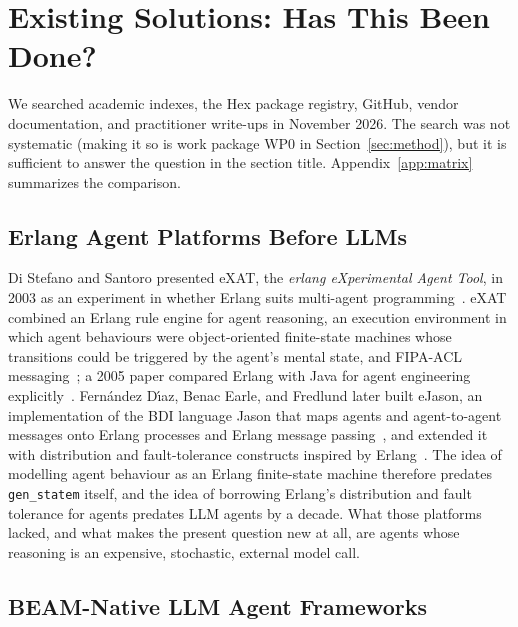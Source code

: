 \documentclass[conference,letterpaper]{IEEEtran}
\newcommand{\code}[1]{\texttt{#1}}
\newcommand{\gsm}{\code{gen\_statem}}
\begin{document}
\section{Existing Solutions: Has This Been Done?}\label{sec:survey}

We searched academic indexes, the Hex package registry, GitHub, vendor
documentation, and practitioner write-ups in November 2026. The search was
not systematic (making it so is work package WP0 in
Section~\ref{sec:method}), but it is sufficient to answer the question in
the section title. Appendix~\ref{app:matrix} summarizes the comparison.

\subsection{Erlang Agent Platforms Before LLMs}

Di Stefano and Santoro presented eXAT, the \emph{erlang eXperimental Agent
Tool}, in 2003 as an experiment in whether Erlang suits multi-agent
programming~\cite{distefano2003}. eXAT combined an Erlang rule engine for
agent reasoning, an execution environment in which agent behaviours were
object-oriented finite-state machines whose transitions could be triggered
by the agent's mental state, and FIPA-ACL messaging~\cite{distefano2004}; a
2005 paper compared Erlang with Java for agent engineering
explicitly~\cite{distefano2005}. Fern\'{a}ndez D\'{\i}az, Benac Earle, and
Fredlund later built eJason, an implementation of the BDI language Jason
that maps agents and agent-to-agent messages onto Erlang processes and
Erlang message passing~\cite{fernandez2013}, and extended it with
distribution and fault-tolerance constructs inspired by
Erlang~\cite{benacearle2017}. The idea of modelling agent behaviour as an
Erlang finite-state machine therefore predates \gsm{} itself, and the idea
of borrowing Erlang's distribution and fault tolerance for agents predates
LLM agents by a decade. What those platforms lacked, and what makes the
present question new at all, are agents whose reasoning is an expensive,
stochastic, external model call.

\subsection{BEAM-Native LLM Agent Frameworks}
\end{document}
